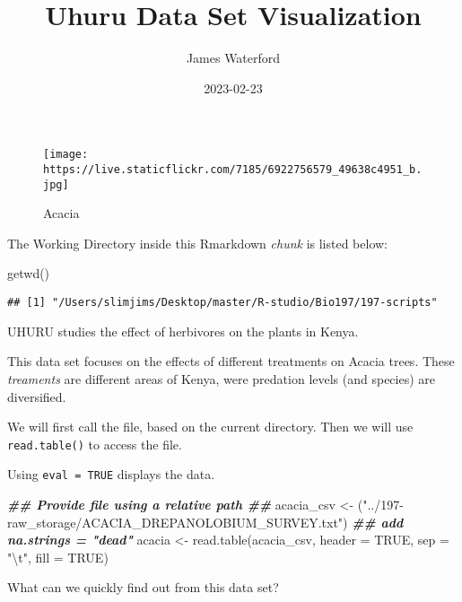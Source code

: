 \documentclass[
]{article}
\title{Uhuru Data Set Visualization}
\author{James Waterford}
\date{2023-02-23}
\newenvironment{Shaded}{\begin{snugshade}}{\end{snugshade}}
\newcommand{\AttributeTok}[1]{\textcolor[rgb]{0.77,0.63,0.00}{#1}}
\newcommand{\ConstantTok}[1]{\textcolor[rgb]{0.00,0.00,0.00}{#1}}
\newcommand{\DocumentationTok}[1]{\textcolor[rgb]{0.56,0.35,0.01}{\textbf{\textit{#1}}}}
\newcommand{\FunctionTok}[1]{\textcolor[rgb]{0.00,0.00,0.00}{#1}}
\newcommand{\NormalTok}[1]{#1}
\newcommand{\OtherTok}[1]{\textcolor[rgb]{0.56,0.35,0.01}{#1}}
\newcommand{\SpecialCharTok}[1]{\textcolor[rgb]{0.00,0.00,0.00}{#1}}
\newcommand{\StringTok}[1]{\textcolor[rgb]{0.31,0.60,0.02}{#1}}
\begin{document}
\maketitle

\begin{figure}
\centering
\texttt{[image: https://live.staticflickr.com/7185/6922756579\_49638c4951\_b.jpg]}
\caption{Acacia}
\end{figure}

The Working Directory inside this Rmarkdown \emph{chunk} is listed
below:

\begin{Shaded}
\begin{Highlighting}[]
\FunctionTok{getwd}\NormalTok{()}
\end{Highlighting}
\end{Shaded}

\begin{verbatim}
## [1] "/Users/slimjims/Desktop/master/R-studio/Bio197/197-scripts"
\end{verbatim}

UHURU studies the effect of herbivores on the plants in Kenya.

This data set focuses on the effects of different treatments on Acacia
trees. These \emph{treaments} are different areas of Kenya, were
predation levels (and species) are diversified.

We will first call the file, based on the current directory. Then we
will use \texttt{read.table()} to access the file.

Using \texttt{eval\ =\ TRUE} displays the data.

\begin{Shaded}
\begin{Highlighting}[]
\DocumentationTok{\#\# Provide file using a relative path \#\#}
\NormalTok{acacia\_csv }\OtherTok{\textless{}{-}}\NormalTok{ (}\StringTok{"../197{-}raw\_storage/ACACIA\_DREPANOLOBIUM\_SURVEY.txt"}\NormalTok{)}
\DocumentationTok{\#\# add \textasciigrave{}na.strings = "dead"}
\NormalTok{acacia }\OtherTok{\textless{}{-}} \FunctionTok{read.table}\NormalTok{(acacia\_csv, }\AttributeTok{header =} \ConstantTok{TRUE}\NormalTok{, }\AttributeTok{sep =} \StringTok{"}\SpecialCharTok{\textbackslash{}t}\StringTok{"}\NormalTok{, }\AttributeTok{fill =} \ConstantTok{TRUE}\NormalTok{)}
\end{Highlighting}
\end{Shaded}

What can we quickly find out from this data set?
\end{document}
